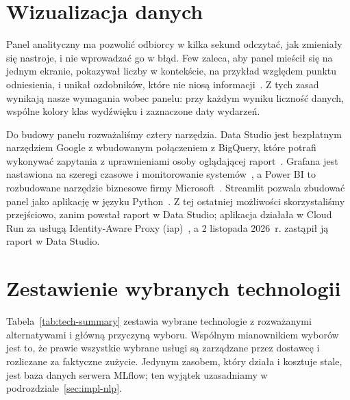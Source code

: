 \section{Wizualizacja danych}
\label{sec:tech-visualisation}

Panel analityczny ma pozwolić odbiorcy w kilka sekund odczytać, jak zmieniały się nastroje, i nie wprowadzać go w błąd.
Few zaleca, aby panel mieścił się na jednym ekranie, pokazywał liczby w kontekście, na przykład względem punktu odniesienia, i unikał ozdobników, które nie niosą informacji~\cite{few2006information}.
Z tych zasad wynikają nasze wymagania wobec panelu: przy każdym wyniku liczność danych, wspólne kolory klas wydźwięku i zaznaczone daty wydarzeń.

Do budowy panelu rozważaliśmy cztery narzędzia.
Data Studio jest bezpłatnym narzędziem Google z wbudowanym połączeniem z BigQuery, które potrafi wykonywać zapytania z uprawnieniami osoby oglądającej raport~\cite{doclookerstudio}.
Grafana jest nastawiona na szeregi czasowe i monitorowanie systemów~\cite{docgrafana}, a Power BI to rozbudowane narzędzie biznesowe firmy Microsoft~\cite{docpowerbi}.
Streamlit pozwala zbudować panel jako aplikację w języku Python~\cite{docstreamlit}.
Z tej ostatniej możliwości skorzystaliśmy przejściowo, zanim powstał raport w Data Studio; aplikacja działała w Cloud Run za usługą Identity-Aware Proxy (\ac{iap})~\cite{dociap}, a 2 listopada 2026~r. zastąpił ją raport w Data Studio.

\section{Zestawienie wybranych technologii}
\label{sec:tech-summary}

Tabela~\ref{tab:tech-summary} zestawia wybrane technologie z rozważanymi alternatywami i główną przyczyną wyboru.
Wspólnym mianownikiem wyborów jest to, że prawie wszystkie wybrane usługi są zarządzane przez dostawcę i rozliczane za faktyczne zużycie.
Jedynym zasobem, który działa i kosztuje stale, jest baza danych serwera MLflow; ten wyjątek uzasadniamy w podrozdziale~\ref{sec:impl-nlp}.

